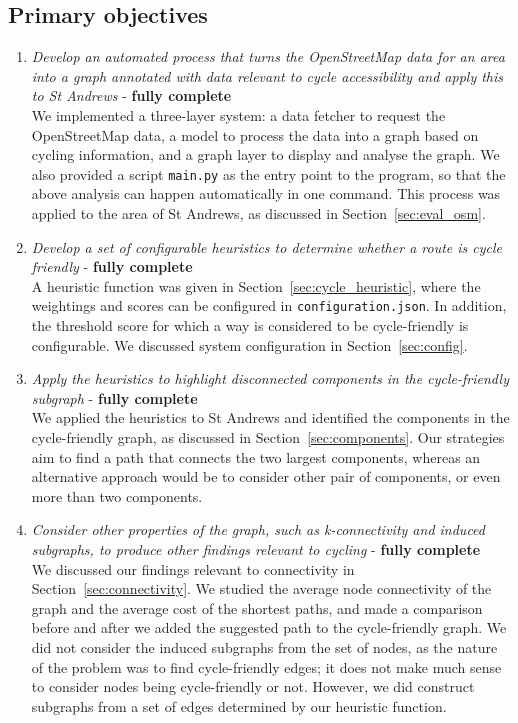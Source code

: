 \documentclass[12pt,a4paper]{report}
\begin{document}
\subsection{Primary objectives}
\begin{enumerate}
    \item \textit{Develop an automated process that turns the OpenStreetMap data for an area into a graph annotated with data relevant to cycle accessibility and apply this to St Andrews} - \textbf{fully complete}\\[1mm]
    We implemented a three-layer system: a data fetcher to request the OpenStreetMap data, a model to process the data into a graph based on cycling information, and a graph layer to display and analyse the graph. We also provided a script \texttt{main.py} as the entry point to the program, so that the above analysis can happen automatically in one command. This process was applied to the area of St Andrews, as discussed in Section~\ref{sec:eval_osm}.

    \item \textit{Develop a set of configurable heuristics to determine whether a route is cycle friendly} - \textbf{fully complete}\\[1mm]
    A heuristic function was given in Section~\ref{sec:cycle_heuristic}, where the weightings and scores can be configured in \texttt{configuration.json}. In addition, the threshold score for which a way is considered to be cycle-friendly is configurable. We discussed system configuration in Section~\ref{sec:config}.

    \item \textit{Apply the heuristics to highlight disconnected components in the cycle-friendly subgraph} - \textbf{fully complete}\\[1mm]
    We applied the heuristics to St Andrews and identified the components in the cycle-friendly graph, as discussed in Section~\ref{sec:components}. Our strategies aim to find a path that connects the two largest components, whereas an alternative approach would be to consider other pair of components, or even more than two components.

    \item \textit{Consider other properties of the graph, such as k-connectivity and induced subgraphs, to produce other findings relevant to cycling} - \textbf{fully complete}\\[1mm]
    We discussed our findings relevant to connectivity in Section~\ref{sec:connectivity}. We studied the average node connectivity of the graph and the average cost of the shortest paths, and made a comparison before and after we added the suggested path to the cycle-friendly graph. We did not consider the induced subgraphs from the set of nodes, as the nature of the problem was to find cycle-friendly edges; it does not make much sense to consider nodes being cycle-friendly or not. However, we did construct subgraphs from a set of edges determined by our heuristic function.


\end{enumerate}
\end{document}

